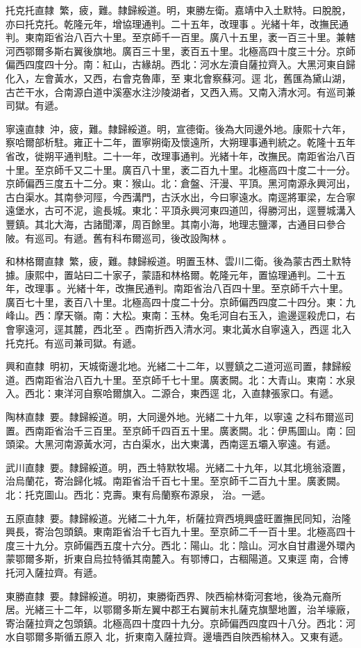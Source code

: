 \begin{pinyinscope}
托克托直隸：繁，疲，難。隸歸綏道。明，東勝左衛。嘉靖中入土默特。曰脫脫，亦曰托克托。乾隆元年，增協理通判。二十五年，改理事。光緒十年，改撫民通判。東南距省治八百六十里。至京師千一百里。廣八十五里，袤一百三十里。兼轄河西鄂爾多斯右翼後旗地。廣百三十里，袤百五十里。北極高四十度三十分。京師偏西四度四十分。南：紅山，古緣胡。西北：河水左瀆自薩拉齊入。大黑河東自歸化入，左會黃水，又西，右會克魯庫，至東北會察蘇河。逕北，舊匯為黛山湖，古芒干水，合南源白道中溪塞水注沙陵湖者，又西入焉。又南入清水河。有巡司兼司獄。有遞。

寧遠直隸：沖，疲，難。隸歸綏道。明，宣德衛。後為大同邊外地。康熙十六年，察哈爾部析駐。雍正十二年，置寧朔衛及懷遠所，大朔理事通判統之。乾隆十五年省改，徙朔平通判駐。二十一年，改理事通判。光緒十年，改撫民。南距省治八百十里。至京師千又二十里。廣百八十里，袤二百九十里。北極高四十度二十一分。京師偏西三度五十二分。東：猴山。北：倉盤、汗漫、平頂。黑河南源永興河出，古白渠水。其南參河陘，今西溝門，古沃水出，今曰寧遠水。南逕將軍梁，左合寧遠堡水，古可不泥，逾長城。東北：平頂永興河東四道凹，得勝河出，逕豐城溝入豐鎮。其北大海，古諸聞澤，周百餘里。其南小海，地理志鹽澤，古通目曰參合陂。有巡司。有遞。舊有科布爾巡司，後改設陶林。

和林格爾直隸：繁，疲，難。隸歸綏道。明置玉林、雲川二衛。後為蒙古西土默特據。康熙中，置站曰二十家子，蒙語和林格爾。乾隆元年，置協理通判。二十五年，改理事。光緒十年，改撫民通判。南距省治八百四十里。至京師千六十里。廣百七十里，袤百八十里。北極高四十度二十分。京師偏西四度二十四分。東：九峰山。西：摩天嶺。南：大松。東南：玉林。兔毛河自右玉入，逾邊逕殺虎口，右會寧遠河，逕其麓，西北至。西南折西入清水河。東北黃水自寧遠入，西逕北入托克托。有巡司兼司獄。有遞。

興和直隸：明初，天城衛邊北地。光緒二十二年，以豐鎮之二道河巡司置，隸歸綏道。西南距省治八百九十里。至京師千七十里。廣袤闕。北：大青山。東南：水泉入。西北：東洋河自察哈爾旗入。二源合，東西逕北，入直隸張家口。有遞。

陶林直隸：要。隸歸綏道。明，大同邊外地。光緒二十九年，以寧遠之科布爾巡司置。西南距省治千三百里。至京師千四百五十里。廣袤闕。北：伊馬圖山。南：回頭梁。大黑河南源黃水河，古白渠水，出大東溝，西南逕五壩入寧遠。有遞。

武川直隸：要。隸歸綏道。明，西土特默牧場。光緒二十九年，以其北境翁滾置，治烏蘭花，寄治歸化城。南距省治千百七十里。至京師千二百九十里。廣袤闕。北：托克圖山。西北：克壽。東有烏蘭察布源泉，治。一遞。

五原直隸：要。隸歸綏道。光緒二十九年，析薩拉齊西境興盛旺置撫民同知，治隆興長，寄治包頭鎮。東南距省治千七百九十里。至京師二千一百十里。北極高四十度三十九分。京師偏西五度十六分。西北：陽山。北：陰山。河水自甘肅邊外環內蒙鄂爾多斯，折東自烏拉特循其南麓入。有鄂博口，古稒陽道。又東逕南，合博托河入薩拉齊。有遞。

東勝直隸：要。隸歸綏道。明初，東勝衛西界、陜西榆林衛河套地，後為元裔所居。光緒三十二年，以鄂爾多斯左翼中郡王右翼前末扎薩克旗墾地置，治羊壕廠，寄治薩拉齊之包頭鎮。北極高四十度四十九分。京師偏西四度四十八分。西北：河水自鄂爾多斯循五原入北，折東南入薩拉齊。邊墻西自陜西榆林入。又東有遞。


\end{pinyinscope}